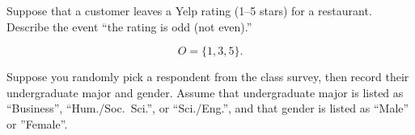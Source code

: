 \documentclass[answers,11pt]{exam}
\begin{document}
\begin{questions}
\question \label{ques:odd-yelp} Suppose that a customer leaves a Yelp
rating (1--5 stars) for a restaurant.  Describe the event ``the rating is odd
(not even).''

\begin{solution}
\[
  O = \{ 1, 3, 5 \}.
\]
\end{solution}



\question \label{ques:survey-male}

Suppose you randomly pick a respondent from the class survey, then record
their undergraduate major and gender.  Assume that undergraduate major is
listed as ``Business'', ``Hum./Soc.~Sci.'', or ``Sci./Eng.'', and that gender
is listed as ``Male'' or ''Female''.



\newpage






\end{questions}
\end{document}
